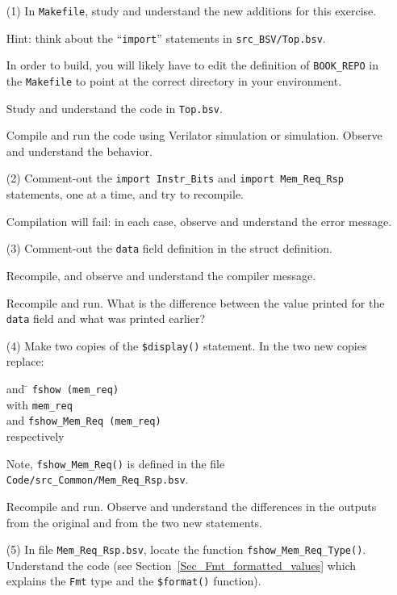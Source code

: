 \begin{itemize}

\item[(1)] In \verb|Makefile|, study and understand the new additions
    for this exercise.

    Hint: think about the ``\verb|import|'' statements in
    \verb|src_BSV/Top.bsv|.

    In order to build, you will likely have to edit the definition of
    \verb|BOOK_REPO| in the \verb|Makefile| to point at the correct
    directory in your environment.

    Study and understand the code in \verb|Top.bsv|.

    Compile and run the code using Verilator simulation or {\BLUESIM}
    simulation.  Observe and understand the behavior.

\item[(2)] Comment-out the \verb|import Instr_Bits| and \verb|import Mem_Req_Rsp|
    statements, one at a time, and try to recompile.

    Compilation will fail: in each case, observe and understand the error message.

\item[(3)] Comment-out the \verb|data| field definition in the struct definition.

    Recompile, and observe and understand the compiler message.

    Recompile and run.  What is the difference between the value
    printed for the \verb|data| field and what was printed earlier?

\item[(4)] Make two copies of the \verb|$display()| statement. In the
    two new copies replace:
    \begin{tabbing}
    \hm and \hm \= \kill
                \> {\tt fshow (mem\_req)} \\
    \hm with    \> {\tt mem\_req} \\
    \hm and     \> {\tt fshow\_Mem\_Req (mem\_req)} \\
    \hm respectively
    \end{tabbing}

    Note, \verb|fshow_Mem_Req()| is defined in the file
    {\tt Code/src\_Common/Mem\_Req\_Rsp.bsv}.

    Recompile and run. Observe and understand the differences in the
    outputs from the original and from the two new statements.

\item[(5)] In file \verb|Mem_Req_Rsp.bsv|, locate the function
    \verb|fshow_Mem_Req_Type()|.  Understand the code (see
    Section~\ref{Sec_Fmt_formatted_values} which explains the
    \verb|Fmt| type and the \verb|$format()| function).


\end{itemize}
